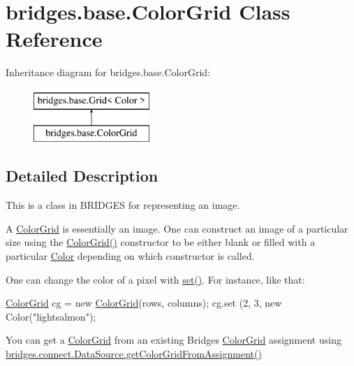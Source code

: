 \hypertarget{classbridges_1_1base_1_1_color_grid}{}\section{bridges.\+base.\+Color\+Grid Class Reference}
\label{classbridges_1_1base_1_1_color_grid}
Inheritance diagram for bridges.\+base.\+Color\+Grid\+:\begin{figure}[H]
\begin{center}
\leavevmode
\includegraphics[height=2.000000cm]{classbridges_1_1base_1_1_color_grid}
\end{center}
\end{figure}


\subsection{Detailed Description}
This is a class in B\+R\+I\+D\+G\+ES for representing an image. 

A \hyperlink{classbridges_1_1base_1_1_color_grid}{Color\+Grid} is essentially an image. One can construct an image of a particular size using the \hyperlink{classbridges_1_1base_1_1_color_grid_af434a5a3dcbaf86e51ac6f9e1c1d7e5f}{Color\+Grid()} constructor to be either blank or filled with a particular \hyperlink{classbridges_1_1base_1_1_color}{Color} depending on which constructor is called.

One can change the color of a pixel with \hyperlink{classbridges_1_1base_1_1_grid_ab79ceb737423bb28ea2348e61a625a17}{set()}. For instance, like that\+: 
\begin{DoxyCode}
\hyperlink{classbridges_1_1base_1_1_color_grid_af434a5a3dcbaf86e51ac6f9e1c1d7e5f}{ColorGrid} cg = \textcolor{keyword}{new} \hyperlink{classbridges_1_1base_1_1_color_grid_af434a5a3dcbaf86e51ac6f9e1c1d7e5f}{ColorGrid}(rows, columns);
cg.set (2, 3, \textcolor{keyword}{new} Color(\textcolor{stringliteral}{"lightsalmon"});
\end{DoxyCode}


You can get a \hyperlink{classbridges_1_1base_1_1_color_grid}{Color\+Grid} from an existing Bridges \hyperlink{classbridges_1_1base_1_1_color_grid}{Color\+Grid} assignment using \hyperlink{classbridges_1_1connect_1_1_data_source_a7bddb93c9196a1109f2bf36054500ed8}{bridges.\+connect.\+Data\+Source.\+get\+Color\+Grid\+From\+Assignment()}

